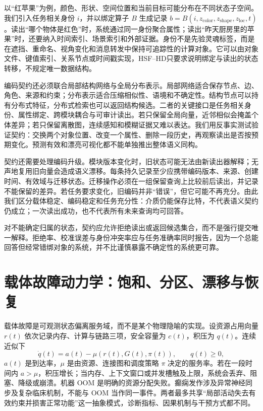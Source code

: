 以“红苹果”为例，颜色、形状、空间位置和当前目标可能分布在不同状态子空间。我们引入任务相关身份 $i$，并以绑定算子 $B$ 生成记录 $b=B(i,z_{\mathrm{color}},z_{\mathrm{shape}},z_{\mathrm{loc}},t)$。读出“哪个物体是红色”时，系统通过同一身份聚合属性；读出“昨天厨房里的苹果”时，还要纳入时间索引、场景索引和外部证据。身份不是先验灵魂标签，而是在遮挡、重命名、视角变化和消息转发中保持可追踪性的计算对象。它可以由对象文件、键值索引、关系节点或时间戳实现，HSF--HD只要求说明绑定与读出的状态转移，不规定唯一数据结构。

编码契约还必须联合局部结构网络与全局分布表示。局部网络适合保存节点、边、角色、来源和约束；分布表示适合压缩相似性、语境和不确定性。结构节点可以持有分布式特征，分布式检索也可以返回结构候选。二者的关键接口是任务相关身份、属性绑定、跨模块耦合与可审计读出。若只保留全局向量，近邻相似会掩盖个体差异；若只保留离散图，连续感知和模糊证据又难以表达。我们用反事实测试验证契约：交换两个对象位置、改变一个属性、删除一段历史，再观察读出是否按预期变化。预测有效和漂亮可视化都不能单独推出整体语义同构。

契约还需要处理编码升级。模块版本变化时，旧状态可能无法由新读出器解释；无声地复用旧向量会造成语义漂移。每条持久记录至少应携带编码版本、来源、创建时间、有效域与迁移状态。迁移操作必须在一组保留查询上比较前后读出，并记录不能保留的差异。若任务要求变化，旧编码并非“错误”，但它可能不再充分。由此我们区分载体稳定、编码稳定和任务充分性：介质仍能保存比特，不代表语义契约仍成立；一次读出成功，也不代表所有未来查询均可回答。

对不能确定归属的状态，契约应允许拒绝读出或返回候选集合，而不是强行提交唯一解释。拒绝率、校准误差与身份冲突率应与任务准确率同时报告，因为一个总能回答但经常错绑对象的系统，并不比谨慎暴露不确定性的系统更可靠。

\section{载体故障动力学：饱和、分区、漂移与恢复}
\label{sec:section_1766}

载体故障是可观测状态偏离服务域，而不是某个物理隐喻的实现。设资源占用向量 $r(t)$ 依次记录内存、计算与链路三项，安全容量为 $c(t)$，积压为 $q(t)$。连续近似下
\[
\dot q(t)=a(t)-\mu(r(t),G(t),\pi(t)),\qquad q(t)\ge0,
\]
$a(t)$ 是到达率，$\mu$ 是由资源、连接图和调度策略 $\pi$ 决定的服务率。若在一段时间内 $a>\mu$，积压增长；当内存、上下文窗口或并发槽触及上限，系统会丢弃、阻塞、降级或崩溃。机器 OOM 是明确的资源分配失败。癫痫发作涉及异常神经同步及复杂临床机制，不能与 OOM 当作同一事件。两者最多共享“局部活动失去有效约束并损害正常功能”这一抽象模式，诊断指标、因果机制与干预方式都不同。

